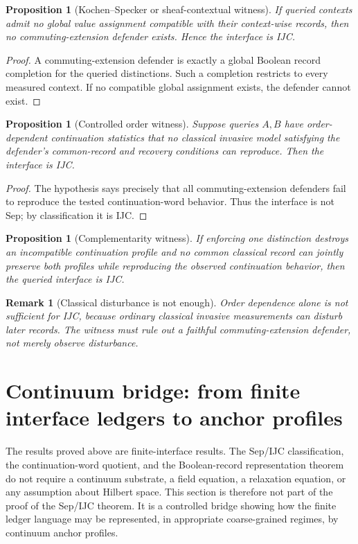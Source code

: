 \documentclass[11pt]{article}
\newtheorem{proposition}[theorem]{Proposition}
\newtheorem{remark}[theorem]{Remark}
\begin{document}
\begin{proposition}[Kochen--Specker or sheaf-contextual witness]
If queried contexts admit no global value assignment compatible with their context-wise records, then no commuting-extension defender exists.  Hence the interface is IJC.
\end{proposition}
\begin{proof}
A commuting-extension defender is exactly a global Boolean record completion for the queried distinctions.  Such a completion restricts to every measured context.  If no compatible global assignment exists, the defender cannot exist.
\end{proof}

\begin{proposition}[Controlled order witness]
Suppose queries $A,B$ have order-dependent continuation statistics that no classical invasive model satisfying the defender's common-record and recovery conditions can reproduce.  Then the interface is IJC.
\end{proposition}
\begin{proof}
The hypothesis says precisely that all commuting-extension defenders fail to reproduce the tested continuation-word behavior.  Thus the interface is not Sep; by classification it is IJC.
\end{proof}

\begin{proposition}[Complementarity witness]
If enforcing one distinction destroys an incompatible continuation profile and no common classical record can jointly preserve both profiles while reproducing the observed continuation behavior, then the queried interface is IJC.
\end{proposition}

\begin{remark}[Classical disturbance is not enough]
Order dependence alone is not sufficient for IJC, because ordinary classical invasive measurements can disturb later records.  The witness must rule out a faithful commuting-extension defender, not merely observe disturbance.
\end{remark}

\section{Continuum bridge: from finite interface ledgers to anchor profiles}\label{sec:recruitment-radius}

The results proved above are finite-interface results.  The Sep/IJC
classification, the continuation-word quotient, and the Boolean-record
representation theorem do not require a continuum substrate, a field
equation, a relaxation equation, or any assumption about Hilbert space.
This section is therefore not part of the proof of the Sep/IJC theorem.
It is a controlled bridge showing how the finite ledger language may be
represented, in appropriate coarse-grained regimes, by continuum anchor
profiles.
\end{document}
